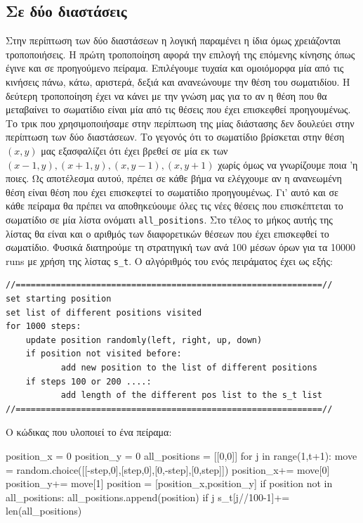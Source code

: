 \subsection{Σε δύο διαστάσεις}
\label{S2D}
Στην περίπτωση των δύο διαστάσεων η λογική παραμένει η ίδια όμως χρειάζονται τροποποιήσεις. Η πρώτη τροποποίηση αφορά την επιλογή της επόμενης κίνησης όπως έγινε και σε προηγούμενο πείραμα. Επιλέγουμε τυχαία και ομοιόμορφα μία από τις κινήσεις πάνω, κάτω, αριστερά, δεξιά και ανανεώνουμε την θέση του σωματιδίου. 
Η δεύτερη τροποποίηση έχει να κάνει με την γνώση μας για το αν η θέση που θα μεταβαίνει το σωματίδιο είναι μία από τις θέσεις που έχει επισκεφθεί προηγουμένως. Το τρικ που χρησιμοποιήσαμε στην περίπτωση της μίας διάστασης δεν δουλεύει στην περίπτωση των δύο διαστάσεων. Το γεγονός ότι το σωματίδιο βρίσκεται στην θέση $(x,y)$ μας εξασφαλίζει ότι έχει βρεθεί σε μία εκ των $(x-1,y),(x+1,y),(x,y-1),(x,y+1)$ χωρίς όμως να γνωρίζουμε ποια 'η ποιες. Ως αποτέλεσμα αυτού, πρέπει σε κάθε βήμα να ελέγχουμε αν η ανανεωμένη θέση είναι θέση που έχει επισκεφτεί το σωματίδιο προηγουμένως. Γι' αυτό και σε κάθε πείραμα θα πρέπει να αποθηκεύουμε όλες τις νέες θέσεις που επισκέπτεται το σωματίδιο σε μία λίστα ονόματι {\en \texttt{all\_positions}}. Στο τέλος το μήκος αυτής της λίστας θα είναι και ο αριθμός των διαφορετικών θέσεων που έχει επισκεφθεί το σωματίδιο. Φυσικά διατηρούμε τη στρατηγική των ανά 100 μέσων όρων για τα 10000 {\en runs} με χρήση της λίστας \texttt{s\_t}. Ο αλγόριθμός του ενός πειράματος έχει ως εξής:
\en
\begin{lstlisting}
//=============================================================//
set starting position
set list of different positions visited
for 1000 steps:
    update position randomly(left, right, up, down)
    if position not visited before:
           add new position to the list of different positions
    if steps 100 or 200 ....:
           add length of the different pos list to the s_t list           
//=============================================================//
\end{lstlisting}
\gr 
Ο κώδικας που υλοποιεί το ένα πείραμα: 
\en
\begin{python}
position_x = 0
position_y = 0 
all_positions = [[0,0]]
for j in range(1,t+1):
    move = random.choice([[-step,0],[step,0],[0,-step],[0,step]])
    position_x+= move[0]
    position_y+= move[1]
    position = [position_x,position_y]
    if position not in all_positions:
        all_positions.append(position)
    if j%
        s_t[j//100-1]+= len(all_positions)
\end{python}
